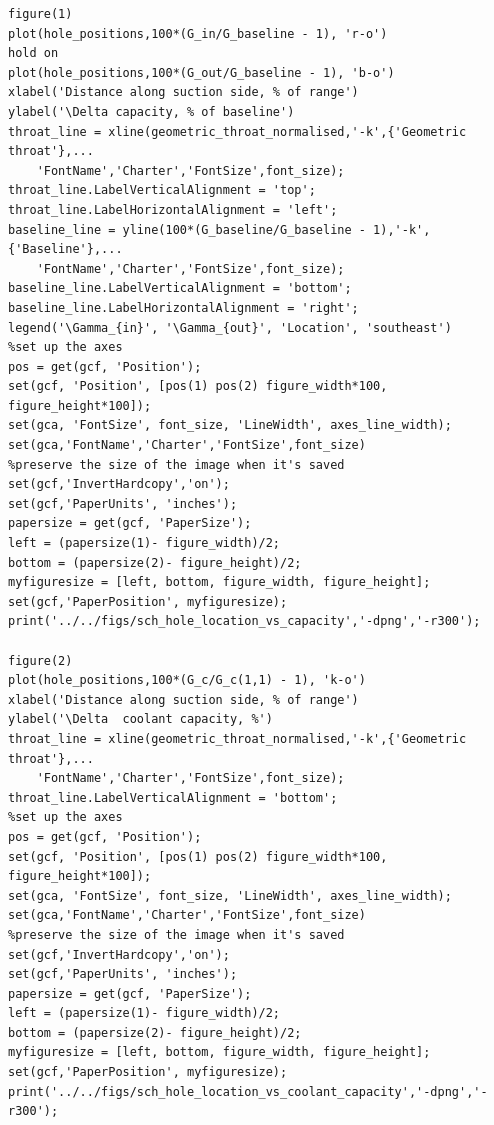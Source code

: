 \documentclass[a4paper, 11pt, oneside]{report}
\begin{document}
\begin{verbatim}
figure(1)
plot(hole_positions,100*(G_in/G_baseline - 1), 'r-o')
hold on
plot(hole_positions,100*(G_out/G_baseline - 1), 'b-o')
xlabel('Distance along suction side, % of range')
ylabel('\Delta capacity, % of baseline')
throat_line = xline(geometric_throat_normalised,'-k',{'Geometric throat'},...
    'FontName','Charter','FontSize',font_size);
throat_line.LabelVerticalAlignment = 'top';
throat_line.LabelHorizontalAlignment = 'left';
baseline_line = yline(100*(G_baseline/G_baseline - 1),'-k',{'Baseline'},...
    'FontName','Charter','FontSize',font_size);
baseline_line.LabelVerticalAlignment = 'bottom';
baseline_line.LabelHorizontalAlignment = 'right';
legend('\Gamma_{in}', '\Gamma_{out}', 'Location', 'southeast')
%set up the axes
pos = get(gcf, 'Position');
set(gcf, 'Position', [pos(1) pos(2) figure_width*100, figure_height*100]);
set(gca, 'FontSize', font_size, 'LineWidth', axes_line_width);
set(gca,'FontName','Charter','FontSize',font_size)
%preserve the size of the image when it's saved
set(gcf,'InvertHardcopy','on');
set(gcf,'PaperUnits', 'inches');
papersize = get(gcf, 'PaperSize');
left = (papersize(1)- figure_width)/2;
bottom = (papersize(2)- figure_height)/2;
myfiguresize = [left, bottom, figure_width, figure_height];
set(gcf,'PaperPosition', myfiguresize);
print('../../figs/sch_hole_location_vs_capacity','-dpng','-r300');

figure(2)
plot(hole_positions,100*(G_c/G_c(1,1) - 1), 'k-o')
xlabel('Distance along suction side, % of range')
ylabel('\Delta  coolant capacity, %')
throat_line = xline(geometric_throat_normalised,'-k',{'Geometric throat'},...
    'FontName','Charter','FontSize',font_size);
throat_line.LabelVerticalAlignment = 'bottom';
%set up the axes
pos = get(gcf, 'Position');
set(gcf, 'Position', [pos(1) pos(2) figure_width*100, figure_height*100]);
set(gca, 'FontSize', font_size, 'LineWidth', axes_line_width);
set(gca,'FontName','Charter','FontSize',font_size)
%preserve the size of the image when it's saved
set(gcf,'InvertHardcopy','on');
set(gcf,'PaperUnits', 'inches');
papersize = get(gcf, 'PaperSize');
left = (papersize(1)- figure_width)/2;
bottom = (papersize(2)- figure_height)/2;
myfiguresize = [left, bottom, figure_width, figure_height];
set(gcf,'PaperPosition', myfiguresize);
print('../../figs/sch_hole_location_vs_coolant_capacity','-dpng','-r300');


\end{verbatim}
\end{document}
